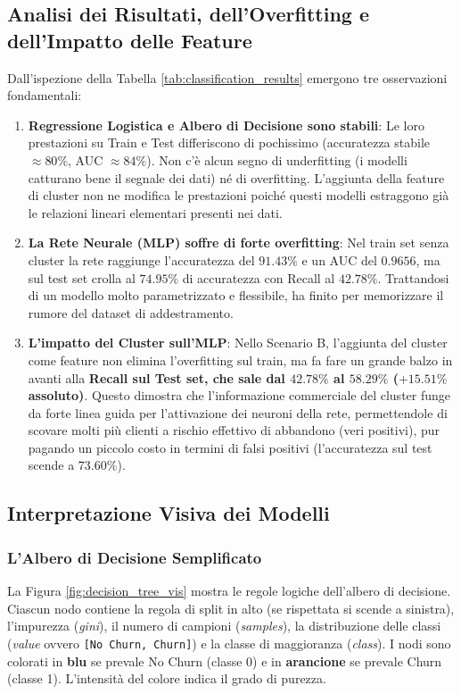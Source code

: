 \documentclass[a4paper,11pt]{article}
\begin{document}
\subsection{Analisi dei Risultati, dell'Overfitting e dell'Impatto delle Feature}
Dall'ispezione della Tabella \ref{tab:classification_results} emergono tre osservazioni fondamentali:
\begin{enumerate}
    \item \textbf{Regressione Logistica e Albero di Decisione sono stabili}: Le loro prestazioni su Train e Test differiscono di pochissimo (accuratezza stabile $\approx 80\%$, AUC $\approx 84\%$). Non c'è alcun segno di underfitting (i modelli catturano bene il segnale dei dati) né di overfitting. L'aggiunta della feature di cluster non ne modifica le prestazioni poiché questi modelli estraggono già le relazioni lineari elementari presenti nei dati.
    \item \textbf{La Rete Neurale (MLP) soffre di forte overfitting}: Nel train set senza cluster la rete raggiunge l'accuratezza del $91.43\%$ e un AUC del $0.9656$, ma sul test set crolla al $74.95\%$ di accuratezza con Recall al $42.78\%$. Trattandosi di un modello molto parametrizzato e flessibile, ha finito per memorizzare il rumore del dataset di addestramento.
    \item \textbf{L'impatto del Cluster sull'MLP}: Nello Scenario B, l'aggiunta del cluster come feature non elimina l'overfitting sul train, ma fa fare un grande balzo in avanti alla \textbf{Recall sul Test set, che sale dal $42.78\%$ al $58.29\%$ ($+15.51\%$ assoluto)}. Questo dimostra che l'informazione commerciale del cluster funge da forte linea guida per l'attivazione dei neuroni della rete, permettendole di scovare molti più clienti a rischio effettivo di abbandono (veri positivi), pur pagando un piccolo costo in termini di falsi positivi (l'accuratezza sul test scende a $73.60\%$).
\end{enumerate}

\subsection{Interpretazione Visiva dei Modelli}

\subsubsection{L'Albero di Decisione Semplificato}
La Figura \ref{fig:decision_tree_vis} mostra le regole logiche dell'albero di decisione. Ciascun nodo contiene la regola di split in alto (se rispettata si scende a sinistra), l'impurezza (\textit{gini}), il numero di campioni (\textit{samples}), la distribuzione delle classi (\textit{value} ovvero \texttt{[No Churn, Churn]}) e la classe di maggioranza (\textit{class}). I nodi sono colorati in \textbf{blu} se prevale No Churn (classe 0) e in \textbf{arancione} se prevale Churn (classe 1). L'intensità del colore indica il grado di purezza.
\end{document}
